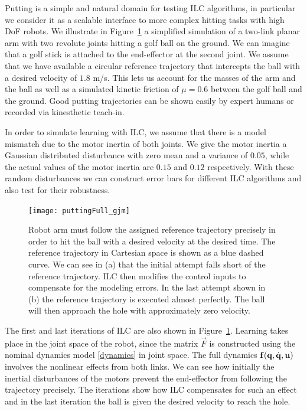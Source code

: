 Putting is a simple and natural domain for testing ILC algorithms, in particular we consider it as a scalable interface to more complex hitting tasks with high DoF robots. We illustrate in Figure~\ref{putting1} a simplified simulation of a two-link planar arm with two revolute joints hitting a golf ball on the ground. We can imagine that a golf stick is attached to the end-effector at the second joint. We assume that we have available a circular reference trajectory that intercepts the ball with a desired velocity of $1.8$ m/s. This lets us account for the masses of the arm and the ball as well as a simulated kinetic friction of $\mu = 0.6$ between the golf ball and the ground. Good putting trajectories can be shown easily by expert humans or recorded via kinesthetic teach-in. 

In order to simulate learning with ILC, we assume that there is a model mismatch due to the motor inertia of both joints. We give the motor inertia a Gaussian distributed disturbance with zero mean and a variance of $0.05$, while the actual values of the motor inertia are $0.15$ and $0.12$ respectively. With these random disturbances we can construct error bars for different ILC algorithms and also test for their robustness.

\begin{figure}
\centering
\texttt{[image: puttingFull\_gjm]}
\caption{Robot arm must follow the assigned reference trajectory precisely in order to hit the ball with a desired velocity at the desired time. The reference trajectory in Cartesian space is shown as a blue dashed curve. We can see in (a) that the initial attempt falls short of the reference trajectory. ILC then modifies the control inputs to compensate for the modeling errors. In the last attempt shown in (b) the reference trajectory is executed almost perfectly. The ball will then approach the hole with approximately zero velocity.} 
\label{putting1} 
\end{figure}


The first and last iterations of ILC are also shown in Figure~\ref{putting1}. Learning takes place in the joint space of the robot, since the matrix $\vec{F}$ is constructed using the nominal dynamics model \eqref{dynamics} in joint space. The full dynamics $\boldsymbol{\mathrm{f}}(\boldsymbol{\mathrm{q}},\dot{\boldsymbol{\mathrm{q}}},\boldsymbol{\mathrm{u}})$ involves the nonlinear effects from both links. We can see how initially the inertial disturbances of the motors prevent the end-effector from following the trajectory precisely. The iterations show how ILC compensates for such an effect and in the last iteration the ball is given the desired velocity to reach the hole. 

